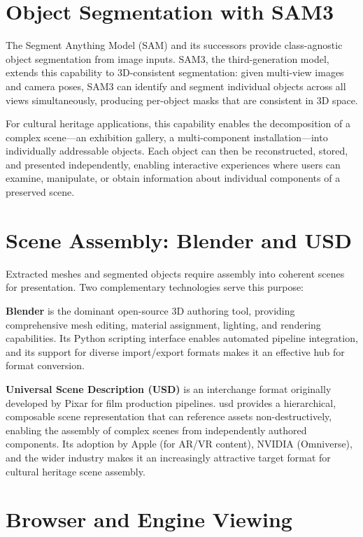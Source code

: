 \section{Object Segmentation with SAM3}
\label{sec:tech-sam}

The Segment Anything Model (SAM) \parencite{Kirillov2023} and its successors provide class-agnostic object segmentation from image inputs. SAM3, the third-generation model, extends this capability to 3D-consistent segmentation: given multi-view images and camera poses, SAM3 can identify and segment individual objects across all views simultaneously, producing per-object masks that are consistent in 3D space.

For cultural heritage applications, this capability enables the decomposition of a complex scene---an exhibition gallery, a multi-component installation---into individually addressable objects. Each object can then be reconstructed, stored, and presented independently, enabling interactive experiences where users can examine, manipulate, or obtain information about individual components of a preserved scene.

\section{Scene Assembly: Blender and USD}
\label{sec:tech-assembly}

Extracted meshes and segmented objects require assembly into coherent scenes for presentation. Two complementary technologies serve this purpose:

\textbf{Blender} \parencite{Blender2024} is the dominant open-source 3D authoring tool, providing comprehensive mesh editing, material assignment, lighting, and rendering capabilities. Its Python scripting interface enables automated pipeline integration, and its support for diverse import/export formats makes it an effective hub for format conversion.

\textbf{Universal Scene Description (USD)} \parencite{Pixar2019} is an interchange format originally developed by Pixar for film production pipelines. \acrshort{usd} provides a hierarchical, composable scene representation that can reference assets non-destructively, enabling the assembly of complex scenes from independently authored components. Its adoption by Apple (for AR/VR content), NVIDIA (Omniverse), and the wider industry makes it an increasingly attractive target format for cultural heritage scene assembly.

\section{Browser and Engine Viewing}
\label{sec:tech-viewing}

